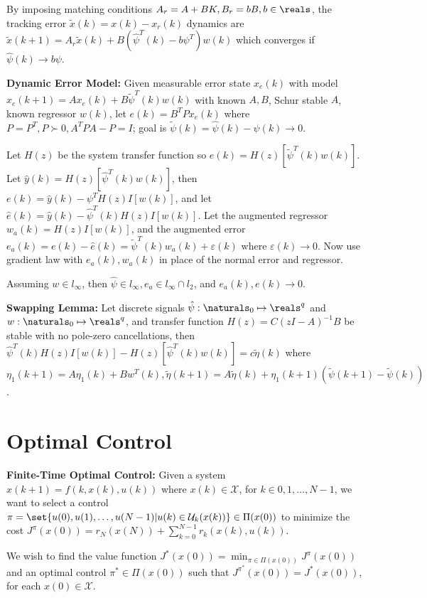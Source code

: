 \documentclass[twocolumn, 8pt]{extarticle}
\begin{document}
By imposing matching conditions \(A_r = A + BK, B_r = bB, b \in \reals\), the tracking error \(\tilde x(k) = x(k) -
x_r(k)\) dynamics are \(\tilde x(k + 1) = A_r\tilde x(k) + B(\hat\psi^T(k) - b\psi^T)w(k)\) which converges if
\(\hat\psi(k) \to b\psi\).

\textbf{Dynamic Error Model:} Given measurable error state \(x_e(k)\) with model \(x_e(k + 1) = Ax_e(k) + B\tilde\psi^T(k)w(k)\)
with known \(A, B\), Schur stable \(A\), known regressor \(w(k)\), let \(e(k) = B^TPx_e(k)\) where \(P = P^T, P \succ 0, A^TPA - P = I\);
goal is \(\tilde\psi(k) = \hat\psi(k) - \psi(k) \to 0\).

Let \(H(z)\) be the system transfer function so \(e(k) = H(z)\left[\tilde\psi^T(k)w(k)\right]\).
Let \(\hat y(k) = H(z)\left[\hat\psi^T(k)w(k)\right]\), then \(e(k) = \hat y(k) - \psi^TH(z)I\left[w(k)\right]\),
and let \(\hat e(k) = \hat y(k) - \hat\psi^T(k)H(z)I\left[w(k)\right]\).
Let the augmented regressor \(w_a(k) = H(z)I\left[w(k)\right]\), and the augmented error
\(e_a(k) = e(k) - \hat e(k) = \tilde\psi^T(k)w_a(k) + \varepsilon(k)\) where \(\varepsilon(k) \to 0\).
Now use gradient law with \(e_a(k), w_a(k)\) in place of the normal error and regressor.

Assuming \(w \in l_\infty\), then $\hat\psi \in l_\infty, e_a \in l_\infty \cap l_2$, and $e_a(k), e(k) \to 0$.

\textbf{Swapping Lemma:} Let discrete signals $\hat\psi: \naturals _0 \mapsto \reals^q$ and $w: \naturals _0 \mapsto
\reals^q$, and transfer function $H(z) = C(zI - A)^{-1}B$ be stable with no pole-zero cancellations, then
\(\hat\psi^T(k)H(z)I\left[w(k)\right] - H(z)\left[\hat\psi^T(k)w(k)\right] = c\tilde\eta(k)\) where \(\eta _1(k + 1) =
A\eta _1(k) + Bw^T(k), \tilde\eta(k + 1) = A\tilde\eta(k) + \eta _1(k + 1)(\tilde\psi(k + 1) - \tilde\psi(k))\).

\section{Optimal Control} %

\textbf{Finite-Time Optimal Control:} Given a system $x(k + 1) = f(k, x(k), u(k))$ where $x(k) \in \mathcal X$, for $k
\in {0, 1, \dots, N - 1}$, we want to select a control $\pi = \set{u(0), u(1), \dots, u(N - 1) | u(k) \in \mathcal
U_k(x(k))} \in \Pi(x(0))$ to minimize the cost $\displaystyle J^\pi(x(0)) = r_N(x(N)) + \sum _{k = 0}^{N - 1} r_k(x(k), u(k))$.

We wish to find the value function $\displaystyle J^*(x(0)) = \min _{\pi \in \Pi(x(0))} J^\pi(x(0))$ and an optimal control
$\pi^* \in \Pi(x(0))$ such that $J^{\pi^*}(x(0)) = J^*(x(0))$, for each $x(0) \in \mathcal X$.
\end{document}
